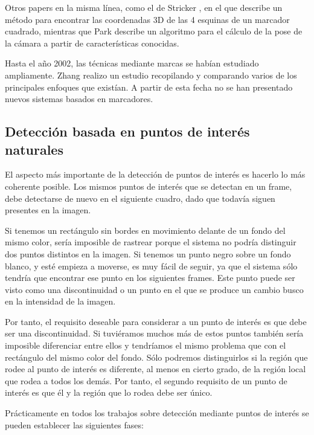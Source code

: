 Otros papers en la misma línea, como el de Stricker \cite{Stricker}, en el que describe un método para encontrar las coordenadas 3D de las 4 esquinas de un marcador cuadrado, mientras que Park \cite{Park2} describe un algoritmo para el cálculo de la pose de la cámara a partir de características conocidas.

Hasta el año 2002, las técnicas mediante marcas se habían estudiado ampliamente. Zhang \cite{Zhang} realizo un estudio recopilando y comparando varios de los principales enfoques que existían. A partir de esta fecha no se han presentado nuevos sistemas basados en marcadores.

\subsection{Detección basada en puntos de interés naturales}

El aspecto más importante de la detección de puntos de interés es hacerlo lo más coherente posible. Los mismos puntos de interés que se detectan en un frame, debe detectarse de nuevo en el siguiente cuadro, dado que todavía siguen presentes en la imagen. 

Si tenemos un rectángulo sin bordes en movimiento delante de un fondo del mismo color, sería imposible de rastrear porque el sistema no podría distinguir dos puntos distintos en la imagen. Si tenemos un punto negro sobre un fondo blanco, y esté empieza a moverse, es muy fácil de seguir, ya que el sistema sólo tendría que encontrar ese punto en los siguientes frames. Este punto puede ser visto como una discontinuidad o un punto en el que se produce un cambio busco en la intensidad de la imagen.

Por tanto, el requisito deseable para considerar a un punto de interés es que debe ser una discontinuidad. Si tuviéramos muchos más de estos puntos también sería imposible diferenciar entre ellos y tendríamos el mismo problema que con el rectángulo del mismo color del fondo. Sólo podremos distinguirlos si la región que rodee al punto de interés es diferente, al menos en cierto grado, de la región local que rodea a todos los demás. Por tanto, el segundo requisito de un punto de interés es que él y la región que lo rodea debe ser único. 

Prácticamente en todos los trabajos sobre detección mediante puntos de interés se pueden establecer las siguientes fases:

